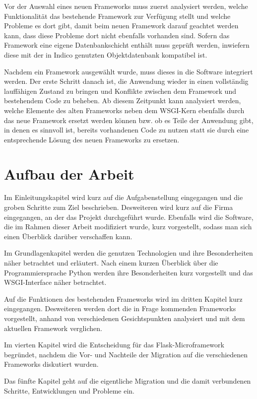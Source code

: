 Vor der Auswahl eines neuen Frameworks muss zuerst analysiert werden, welche Funktionalität das
bestehende Framework zur Verfügung stellt und welche Probleme es dort gibt, damit beim neuen
Framework darauf geachtet werden kann, dass diese Probleme dort nicht ebenfalls vorhanden sind.
Sofern das Framework eine eigene Datenbankschicht enthält muss geprüft werden, inwiefern diese mit
der in Indico genutzten Objektdatenbank kompatibel ist.

Nachdem ein Framework ausgewählt wurde, muss dieses in die Software integriert werden. Der erste
Schritt danach ist, die Anwendung wieder in einen vollständig lauffähigen Zustand zu bringen und
Konflikte zwischen dem Framework und bestehendem Code zu beheben. Ab diesem Zeitpunkt kann
analysiert werden, welche Elemente des alten Frameworks neben dem WSGI-Kern ebenfalls durch das neue
Framework ersetzt werden können bzw. ob es Teile der Anwendung gibt, in denen es sinnvoll ist,
bereits vorhandenen Code zu nutzen statt sie durch eine entsprechende Lösung des neuen Frameworks zu
ersetzen.


\section{Aufbau der Arbeit}

Im Einleitungskapitel wird kurz auf die Aufgabenstellung eingegangen und die groben Schritte zum
Ziel beschrieben. Desweiteren wird kurz auf die Firma eingegangen, an der das Projekt durchgeführt
wurde.
Ebenfalls wird die Software, die im Rahmen dieser Arbeit modifiziert wurde, kurz vorgestellt, sodass
man sich einen Überblick darüber verschaffen kann.

Im Grundlagenkapitel werden die genutzen Technologien und ihre Besonderheiten näher betrachtet und
erläutert. Nach einem kurzen Überblick über die Programmiersprache Python werden ihre Besonderheiten
kurz vorgestellt und das WSGI-Interface näher betrachtet.

Auf die Funktionen des bestehenden Frameworks wird im dritten Kapitel kurz eingegangen. Desweiteren
werden dort die in Frage kommenden Frameworks vorgestellt, anhand von verschiedenen Gesichtspunkten
analysiert und mit dem aktuellen Framework verglichen.

Im vierten Kapitel wird die Entscheidung für das Flask-Microframework begründet, nachdem die Vor-
und Nachteile der Migration auf die verschiedenen Frameworks diskutiert wurden.

Das fünfte Kapitel geht auf die eigentliche Migration und die damit verbundenen Schritte,
Entwicklungen und Probleme ein.

